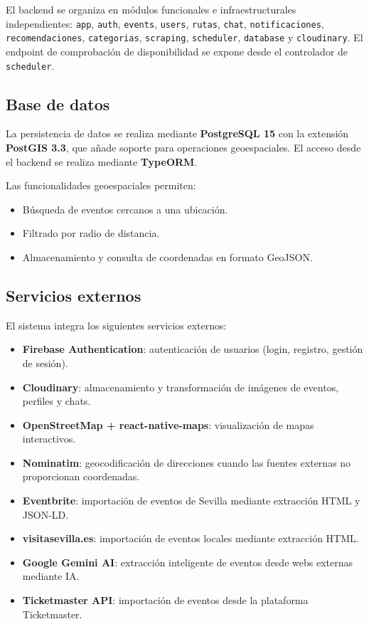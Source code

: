 El backend se organiza en módulos funcionales e infraestructurales independientes: \texttt{app}, \texttt{auth}, \texttt{events}, \texttt{users}, \texttt{rutas}, \texttt{chat}, \texttt{notificaciones}, \texttt{recomendaciones}, \texttt{categorias}, \texttt{scraping}, \texttt{scheduler}, \texttt{database} y \texttt{cloudinary}. El endpoint de comprobación de disponibilidad se expone desde el controlador de \texttt{scheduler}.

\subsection{Base de datos}

La persistencia de datos se realiza mediante \textbf{PostgreSQL 15} con la extensión \textbf{PostGIS 3.3}, que añade soporte para operaciones geoespaciales. El acceso desde el backend se realiza mediante \textbf{TypeORM}.

Las funcionalidades geoespaciales permiten:
\begin{itemize}
    \item Búsqueda de eventos cercanos a una ubicación.
    \item Filtrado por radio de distancia.
    \item Almacenamiento y consulta de coordenadas en formato GeoJSON.
\end{itemize}

\subsection{Servicios externos}

El sistema integra los siguientes servicios externos:

\begin{itemize}
    \item \textbf{Firebase Authentication}: autenticación de usuarios (login, registro, gestión de sesión).
    \item \textbf{Cloudinary}: almacenamiento y transformación de imágenes de eventos, perfiles y chats.
    \item \textbf{OpenStreetMap + react-native-maps}: visualización de mapas interactivos.
    \item \textbf{Nominatim}: geocodificación de direcciones cuando las fuentes externas no proporcionan coordenadas.
    \item \textbf{Eventbrite}: importación de eventos de Sevilla mediante extracción HTML y JSON-LD.
    \item \textbf{visitasevilla.es}: importación de eventos locales mediante extracción HTML.
    \item \textbf{Google Gemini AI}: extracción inteligente de eventos desde webs externas mediante IA.
    \item \textbf{Ticketmaster API}: importación de eventos desde la plataforma Ticketmaster.
\end{itemize}

